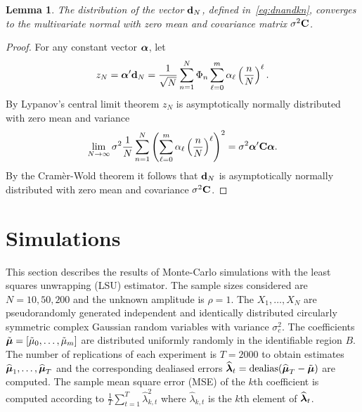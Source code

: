 \documentclass[aap]{imsart}
\newcommand{\var}{\operatorname{var}}
\newcommand{\covar}{\operatorname{covar}}
\newcommand{\dealias}{\operatorname{dealias}}
\newtheorem{lemma}{Lemma}
\begin{document}
\begin{lemma}\label{eq:convdn}
The distribution of the vector $\mathbf{d}_N$, defined in~\eqref{eq:dnandkn}, converges to the multivariate normal with zero mean and covariance matrix $\sigma^2\mathbf{C}$.
\end{lemma}
\begin{proof}
For any constant vector $\boldsymbol{\alpha}$, let
\[
z_N = \boldsymbol{\alpha}^\prime \mathbf{d}_N = \frac{1}{\sqrt{N}} \sum_{n=1}^{N} \Phi_n \sum_{\ell=0}^{m}\alpha_\ell\left( \frac{n}{N} \right)^\ell.
\]
By Lypanov's central limit theorem $z_N$ is asymptotically normally distributed with zero mean and variance
\[
\lim_{N\rightarrow\infty} \sigma^2 \frac{1}{N} \sum_{n=1}^{N}\left( \sum_{\ell=0}^{m}\alpha_\ell\left( \frac{n}{N} \right)^\ell \right)^2 = \sigma^2 \boldsymbol{\alpha}^\prime \mathbf{C} \boldsymbol{\alpha}.
\]
By the Cram\`{e}r-Wold theorem it follows that $\mathbf{d}_N$ is asymptotically normally distributed with zero mean and covariance $\sigma^2 \mathbf{C}$. 
\end{proof}

\section{Simulations}\label{sec:simulations} 
 
This section describes the results of Monte-Carlo simulations with the least squares unwrapping (LSU) estimator.  The sample sizes considered are $N = 10, 50, 200$ and the unknown amplitude is $\rho = 1$.  The $X_1, \dots, X_N$ are pseudorandomly generated independent and identically distributed circularly symmetric complex Gaussian random variables with variance $\sigma_c^2$.  The coefficients $\tilde{\boldsymbol{\mu}} = [\tilde{\mu}_0, \dots, \tilde{\mu}_m]$ are distributed uniformly randomly in the identifiable region $B$.  The number of replications of each experiment is $T = 2000$ to obtain estimates $\widehat{\boldsymbol{\mu}}_1, \dots, \widehat{\boldsymbol{\mu}}_T$ and the corresponding dealiased errors $\widehat{\lambdabf}_t = \dealias(\widehat{\mubf}_T - \tilde{\mubf})$ are computed.  The sample mean square error (MSE) of the $k$th coefficient is computed according to $\tfrac{1}{T}\sum_{t=1}^T \widehat{\lambda}_{k,t}^2$ where $\widehat{\lambda}_{k,t}$ is the $k$th element of $\widehat{\boldsymbol{\lambda}}_t$. 
\end{document}
